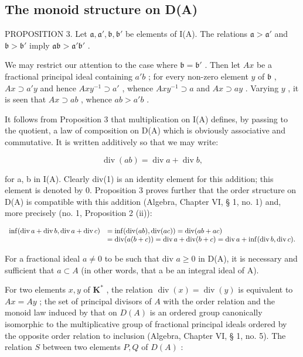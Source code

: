 \subsection{The monoid structure on D(A)}

PROPOSITION 3. Let \(\mathfrak{a}, \mathfrak{a}', \mathfrak{b}, \mathfrak{b}'\) be elements of I(A). The relations \(\mathfrak{a} > \mathfrak{a}'\) and \(\mathfrak{b} > \mathfrak{b}'\) imply \(\mathfrak{ab} > \mathfrak{a}'\mathfrak{b}'\) .

We may restrict our attention to the case where \(\mathfrak{b} = \mathfrak{b}'\) . Then let \(Ax\) be a fractional principal ideal containing \(a'b\) ; for every non-zero element \(y\) of \(\mathfrak{b}\) , \(Ax \supset a'y\) and hence \(Axy^{-1} \supset a'\) , whence \(Axy^{-1} \supset a\) and \(Ax \supset ay\) . Varying \(y\) , it is seen that \(Ax \supset ab\) , whence \(ab > a'b\) .

It follows from Proposition 3 that multiplication on I(A) defines, by passing to the quotient, a law of composition on D(A) which is obviously associative and commutative. It is written additively so that we may write:

\[
\operatorname{div} (a b) = \operatorname{div} a + \operatorname{div} b,\tag{2}
\]

for a, b in I(A). Clearly div(1) is an identity element for this addition; this element is denoted by 0. Proposition 3 proves further that the order structure on D(A) is compatible with this addition (Algebra, Chapter VI, § 1, no. 1) and, more precisely (no. 1, Proposition 2 (ii)):

\[
\begin{array}{r l} \inf (\operatorname{div} a + \operatorname{div} b, \operatorname{div} a + \operatorname{div} c) & = \inf (\operatorname{div} (a b), \operatorname{div} (a c)) = \operatorname{div} (a b + a c) \\ & = \operatorname{div} (a (b + c)) = \operatorname{div} a + \operatorname{div} (b + c) = \operatorname{div} a + \inf (\operatorname{div} b, \operatorname{div} c). \end{array}
\]

For a fractional ideal \(a \neq 0\) to be such that div \(a \geqslant 0\) in D(A), it is necessary and sufficient that \(a \subset A\) (in other words, that a be an integral ideal of A).

For two elements \(x, y\) of \(\mathbf{K}^*\) , the relation \(\operatorname{div}(x) = \operatorname{div}(y)\) is equivalent to \(A x = A y\) ; the set of principal divisors of \(A\) with the order relation and the monoid law induced by that on \(D(A)\) is an ordered group canonically isomorphic to the multiplicative group of fractional principal ideals ordered by the opposite order relation to inclusion (Algebra, Chapter VI, § 1, no. 5). The relation \(S\) between two elements \(P, Q\) of \(D(A)\) :

